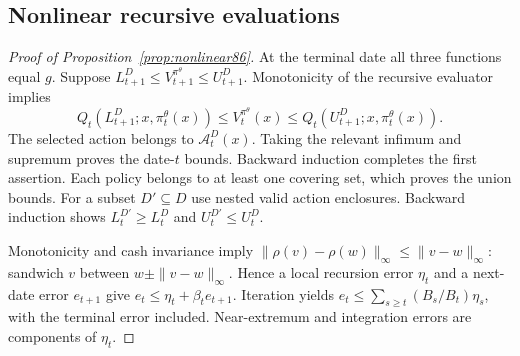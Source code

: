 \subsection{Nonlinear recursive evaluations}
\begin{proof}[Proof of Proposition~\ref{prop:nonlinear86}]
At the terminal date all three functions equal $g$. Suppose $L_{t+1}^D\le V_{t+1}^{\pi^\theta}\le U_{t+1}^D$. Monotonicity of the recursive evaluator implies
\[
 Q_t(L_{t+1}^D;x,\pi_t^\theta(x))
 \le V_t^{\pi^\theta}(x)
 \le Q_t(U_{t+1}^D;x,\pi_t^\theta(x)).
\]
The selected action belongs to $\mathcal A_t^D(x)$. Taking the relevant infimum and supremum proves the date-$t$ bounds. Backward induction completes the first assertion. Each policy belongs to at least one covering set, which proves the union bounds. For a subset $D'\subseteq D$ use nested valid action enclosures. Backward induction shows $L_t^{D'}\ge L_t^D$ and $U_t^{D'}\le U_t^D$.

Monotonicity and cash invariance imply $\|\rho(v)-\rho(w)\|_\infty\le\|v-w\|_\infty$: sandwich $v$ between $w\pm\|v-w\|_\infty$. Hence a local recursion error $\eta_t$ and a next-date error $e_{t+1}$ give $e_t\le\eta_t+\beta_te_{t+1}$. Iteration yields $e_t\le\sum_{s\ge t}(B_s/B_t)\eta_s$, with the terminal error included. Near-extremum and integration errors are components of $\eta_t$.
\end{proof}


